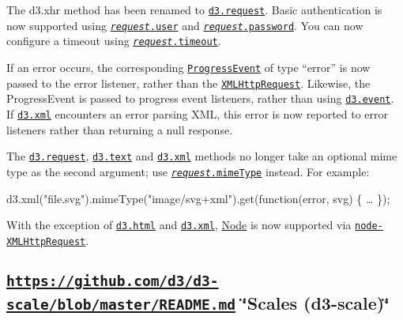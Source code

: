 The d3.\+xhr method has been renamed to \href{https://github.com/d3/d3-request/blob/master/README.md#request}{\tt d3.\+request}. Basic authentication is now supported using \href{https://github.com/d3/d3-request/blob/master/README.md#request_user}{\tt {\itshape request}.user} and \href{https://github.com/d3/d3-request/blob/master/README.md#request_password}{\tt {\itshape request}.password}. You can now configure a timeout using \href{https://github.com/d3/d3-request/blob/master/README.md#request_timeout}{\tt {\itshape request}.timeout}.

If an error occurs, the corresponding \href{https://xhr.spec.whatwg.org/#interface-progressevent}{\tt Progress\+Event} of type “error” is now passed to the error listener, rather than the \href{https://xhr.spec.whatwg.org/#interface-xmlhttprequest}{\tt X\+M\+L\+Http\+Request}. Likewise, the Progress\+Event is passed to progress event listeners, rather than using \href{https://github.com/d3/d3-selection/blob/master/README.md#event}{\tt d3.\+event}. If \href{https://github.com/d3/d3-request/blob/master/README.md#xml}{\tt d3.\+xml} encounters an error parsing X\+ML, this error is now reported to error listeners rather than returning a null response.

The \href{https://github.com/d3/d3-request/blob/master/README.md#request}{\tt d3.\+request}, \href{https://github.com/d3/d3-request/blob/master/README.md#text}{\tt d3.\+text} and \href{https://github.com/d3/d3-request/blob/master/README.md#xml}{\tt d3.\+xml} methods no longer take an optional mime type as the second argument; use \href{https://github.com/d3/d3-request/blob/master/README.md#request_mimeType}{\tt {\itshape request}.mime\+Type} instead. For example\+:


\begin{DoxyCode}
d3.xml("file.svg").mimeType("image/svg+xml").get(function(error, svg) \{
  …
\});
\end{DoxyCode}


With the exception of \href{https://github.com/d3/d3-request/blob/master/README.md#html}{\tt d3.\+html} and \href{https://github.com/d3/d3-request/blob/master/README.md#xml}{\tt d3.\+xml}, \mbox{\hyperlink{classNode}{Node}} is now supported via \href{https://github.com/driverdan/node-XMLHttpRequest}{\tt node-\/\+X\+M\+L\+Http\+Request}.

\subsection*{\href{https://github.com/d3/d3-scale/blob/master/README.md}{\tt https\+://github.\+com/d3/d3-\/scale/blob/master/\+R\+E\+A\+D\+M\+E.\+md} \char`\"{}\+Scales (d3-\/scale)\char`\"{}}

